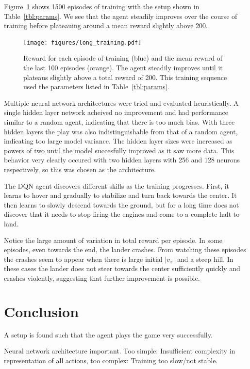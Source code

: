 \documentclass{article}
\begin{document}
Figure~\ref{fig:training} shows 1500 episodes of training with the setup shown in Table~\ref{tbl:params}. We see that the agent steadily improves over the course of training before plateauing around a mean reward slightly above 200.

\begin{figure}[tb]
  \centering
  \texttt{[image: figures/long\_training.pdf]}
  \caption{Reward for each episode of training (blue) and the mean reward of the last 100 episodes (orange). The agent steadily improves until it plateaus slightly above a total reward of 200. This training sequence used the parameters listed in Table~\ref{tbl:params}.}
  \label{fig:training}
\end{figure}

Multiple neural network architectures were tried and evaluated heuristically. A single hidden layer network acheived no improvement and had performance similar to a random agent, indicating that there is too much bias. With three hidden layers the play was also indistinguishable from that of a random agent, indicating too large model variance. The hidden layer sizes were increased as powers of two until the model succesfully improved as it saw more data. This behavior very clearly occured with two hidden layers with 256 and 128 neurons respectively, so this was chosen as the architecture.

The DQN agent discovers different skills as the training progresses. First, it learns to hover and gradually to stabilize and turn back towards the center. It then learns to slowly descend towards the ground, but for a long time does not discover that it needs to stop firing the engines and come to a complete halt to land.

Notice the large amount of variation in total reward per episode. In some episodes, even towards the end, the lander crashes. From watching these episodes the crashes seem to appear when there is large initial $|v_x|$ and a steep hill. In these cases the lander does not steer towards the center sufficiently quickly and crashes violently, suggesting that further improvement is possible.

\section{Conclusion}
\label{conclusion}
A setup is found such that the agent plays the game very successfully.

Neural network architecture important. Too simple: Insufficient complexity in representation of all actions, too complex: Training too slow/not stable.
\end{document}
